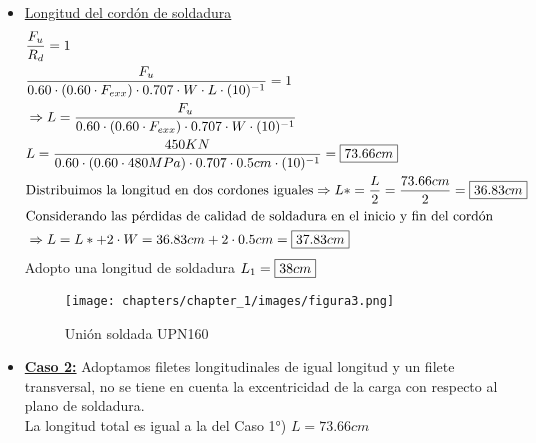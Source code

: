 \begin{enumerate}
\begin{itemize}
\item \underline{Longitud del cordón de soldadura}
\begin{align*}
& \frac{F_u}{R_d} = 1\\
& \frac{F_u}{0.60 \cdot (0.60 \cdot F_{exx}) \cdot 0.707 \cdot W \cdot L \cdot (10)^{-1}} = 1\\
& \Rightarrow L = \frac{F_u}{0.60 \cdot (0.60 \cdot F_{exx}) \cdot 0.707 \cdot W \cdot (10)^{-1}} \\
& L = \frac{450KN}{0.60 \cdot (0.60 \cdot 480MPa) \cdot 0.707 \cdot 0.5cm \cdot (10)^{-1}} = \framebox{$73.66cm$} \\
& \text{Distribuimos la longitud en dos cordones iguales} \Rightarrow L* = \frac{L}{2} = \frac{73.66cm}{2} = \framebox{$36.83cm$} \\
& \text{Considerando las pérdidas de calidad de soldadura en el inicio y fin del cordón} \\
& \Rightarrow L = L* + 2 \cdot W = 36.83cm + 2 \cdot 0.5cm = \framebox{$37.83cm$} \\
\end{align*}
Adopto una longitud de soldadura $L_1 = \framebox{$38 cm$}$\\
\begin{figure}[H]
\begin{center}
     \texttt{[image: chapters/chapter\_1/images/figura3.png]}
\end{center}
\caption{Unión soldada UPN160}
\end{figure}

\item \underline{\textbf{Caso 2:}}
Adoptamos filetes longitudinales de igual longitud y un filete transversal, no se tiene en cuenta la excentricidad de la carga con respecto al plano de soldadura.\\
La longitud total es igual a la del Caso 1°) $L = 73.66cm$ \\


\end{itemize}
\end{enumerate}
